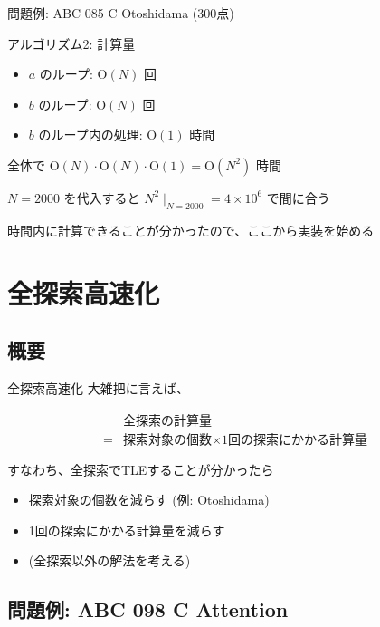 \documentclass[dvipdfmx]{beamer}
\begin{document}
\begin{frame}{問題例: ABC 085 C Otoshidama (300点)}
  \begin{block}{アルゴリズム2: 計算量}
    \begin{itemize}
      \item $a$ のループ: $\mathrm{O}(N)$ 回
      \item $b$ のループ: $\mathrm{O}(N)$ 回
      \item $b$ のループ内の処理: $\mathrm{O}(1)$ 時間
    \end{itemize}
    全体で $\mathrm{O}(N) \cdot \mathrm{O}(N) \cdot \mathrm{O}(1) = \mathrm{O}(N^2)$ 時間

    $N=2000$ を代入すると $N^2 \mid_{N=2000} = 4 \times 10^6$ で間に合う

    時間内に計算できることが分かったので、ここから実装を始める
  \end{block}
\end{frame}

\section{全探索高速化}

\subsection{概要}

\begin{frame}{全探索高速化}
  大雑把に言えば、

  {\Large
  \begin{align*}
    & \text{全探索の計算量} \\
    =& \text{探索対象の個数} \times \text{1回の探索にかかる計算量}
  \end{align*}
  }

  すなわち、全探索でTLEすることが分かったら
  \begin{itemize}
    \item 探索対象の個数を減らす (例: Otoshidama)
    \item 1回の探索にかかる計算量を減らす
    \item (全探索以外の解法を考える)
  \end{itemize}
\end{frame}

\subsection{問題例: ABC 098 C Attention}
\end{document}
